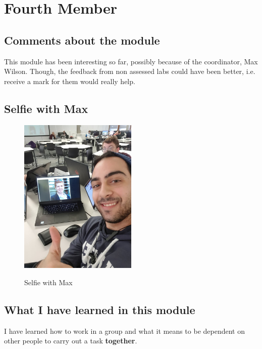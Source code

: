 \section{Fourth Member}

\subsection{Comments about the module}

This module has been interesting so far, possibly because of the coordinator,  Max Wilson.  Though, the feedback from non assessed labs could have been better, i.e. receive a mark for them would really help.

\subsection{Selfie with Max}

\begin{figure}[h]
\caption{Selfie with Max}
\centering
\includegraphics[width=0.5\textwidth]{myselfie.jpg}
\label{fig:selfie}
\end{figure}


\subsection{What I have learned in this module}
I have learned how to work in a group and what it means to be dependent on other people to carry out a task \textbf{together}.
